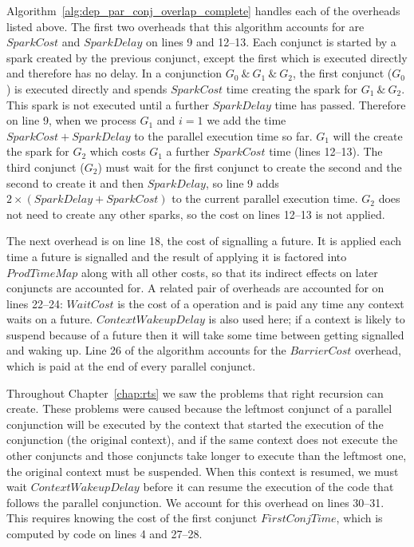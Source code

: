 Algorithm~\ref{alg:dep_par_conj_overlap_complete} handles each of the
overheads listed above.
The first two overheads that this algorithm accounts for are
$SparkCost$ and $SparkDelay$ on lines 9 and 12--13.
Each conjunct is started by a spark created by the previous conjunct,
except the first which is executed directly and therefore has no delay.
In a conjunction $G_0~\&~G_1~\&~G_2$,
the first conjunct ($G_0$) is executed directly and spends
$SparkCost$ time creating the spark for $G_1~\&~G_2$.
This spark is not executed until a further $SparkDelay$ time has passed.
Therefore on line 9, when we process $G_1$ and $i = 1$ we add the time
$SparkCost + SparkDelay$ to the parallel execution time so far.
$G_1$ will the create the spark for $G_2$ which costs $G_1$ a further
$SparkCost$ time (lines 12--13).
The third conjunct ($G_2$) must wait for the first conjunct to create the
second and the second to create it and then $SparkDelay$,
so line 9 adds $2\times(SparkDelay + SparkCost)$ to the current parallel
execution time.
$G_2$ does not need to create any other sparks, so the cost on lines 12--13
is not applied.

The next overhead is on line 18, the cost of signalling a future.
It is applied each time a future is signalled and the result of applying it
is factored into $ProdTimeMap$ along with all other costs,
so that its indirect effects on later conjuncts are accounted for.
A related pair of overheads are accounted for on lines 22--24:
$WaitCost$ is the cost of a \wait operation and is paid any time any context
waits on a future.
$ContextWakeupDelay$ is also used here;
if a context is likely to suspend
because of a future then it will take some time between getting signalled and
waking up.
Line 26 of the algorithm accounts for the $BarrierCost$ overhead,
which is paid at the end of every parallel conjunct.

Throughout Chapter~\ref{chap:rts} we saw the problems that right recursion
can create.
These problems were caused because the leftmost conjunct of a parallel
conjunction will be executed by the context that started the execution of
the conjunction (the original context),
and if the same context does not execute the other conjuncts and those
conjuncts take longer to execute than the leftmost one,
the original context must be suspended.
When this context is resumed,
we must wait $ContextWakeupDelay$ before it can
resume the execution of the code that follows the parallel conjunction.
We account for this overhead on lines 30--31.
This requires knowing the cost of the first conjunct $FirstConjTime$,
which is computed by code on lines 4 and 27--28.


